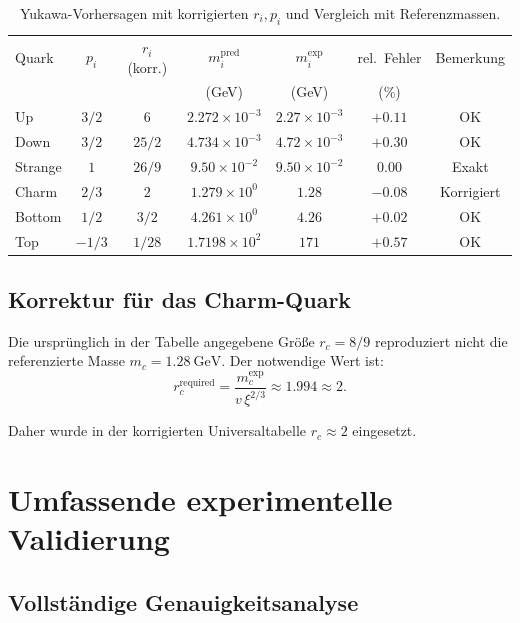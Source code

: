 	\begin{table}[H]
		\centering
		\begin{tabular}{lcccccc}
			\toprule
			Quark & $p_i$ & $r_i$ (korr.) & $m_i^{\text{pred}}$ & $m_i^{\text{exp}}$ & rel.\ Fehler & Bemerkung\\
			& & & (GeV) & (GeV) & (\%) & \\
			\midrule
			Up     & $3/2$ & $6$        & $2.272\times10^{-3}$ & $2.27\times10^{-3}$ & $+0.11$ & OK \\
			Down   & $3/2$ & $25/2$     & $4.734\times10^{-3}$ & $4.72\times10^{-3}$ & $+0.30$ & OK \\
			Strange& $1$   & $26/9$        & $9.50\times10^{-2}$  & $9.50\times10^{-2}$  & $0.00$ & Exakt\\
			Charm  & $2/3$ & $2$      & $1.279\times10^{0}$  & $1.28$              & $-0.08$ & Korrigiert\\
			Bottom & $1/2$ & $3/2$      & $4.261\times10^{0}$   & $4.26$              & $+0.02$ & OK \\
			Top    & $-1/3$& $1/28$     & $1.7198\times10^{2}$  & $171$               & $+0.57$ & OK \\
			\bottomrule
		\end{tabular}
		\caption{Yukawa-Vorhersagen mit korrigierten $r_i,p_i$ und Vergleich mit Referenzmassen.}
		\label{tab:quark_yukawa_predictions}
	\end{table}
	
	\subsection{Korrektur für das Charm-Quark}
	\label{subsec:charm_correction}
	
	Die ursprünglich in der Tabelle angegebene Größe $r_c=8/9$ reproduziert nicht die referenzierte Masse $m_c=1.28\ \mathrm{GeV}$. Der notwendige Wert ist:
	\[
	r_c^{\text{required}}=\frac{m_c^{\text{exp}}}{v\,\xi^{2/3}}\approx 1.994 \approx 2.
	\]
	
	Daher wurde in der korrigierten Universaltabelle $r_c \approx 2$ eingesetzt.
	
	\section{Umfassende experimentelle Validierung}
	\label{sec:comprehensive_validation}
	
	\subsection{Vollständige Genauigkeitsanalyse}
	\label{subsec:complete_accuracy}
	
